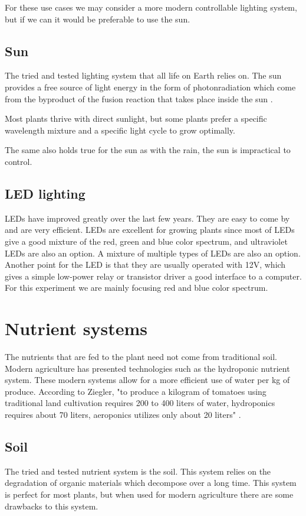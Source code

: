 \documentclass[a4paper,12pt,twoside,openright,titlepage]{book}
\begin{document}
For these use cases we may consider a more modern controllable lighting system, but if we can it would be preferable to use the sun.

\subsection{Sun}
The tried and tested lighting system that all life on Earth relies on.
The sun provides a free source of light energy in the form of photonradiation which come from the byproduct of the fusion reaction that takes place inside the sun \cite{abhyankar}.

Most plants thrive with direct sunlight, but some plants prefer a specific wavelength mixture and a specific light cycle to grow optimally.

The same also holds true for the sun as with the rain, the sun is impractical to control.

\subsection{LED lighting}
LEDs have improved greatly over the last few years. They are easy to come by and are very efficient.
LEDs are excellent for growing plants since most of LEDs give a good mixture of the red, green and blue color spectrum, and ultraviolet LEDs are also an option.
A mixture of multiple types of LEDs are also an option.
Another point for the LED is that they are usually operated with 12V, which gives a simple low-power relay or transistor driver a good interface to a computer.
For this experiment we are mainly focusing red and blue color spectrum.

\section{Nutrient systems}
The nutrients that are fed to the plant need not come from traditional soil.
Modern agriculture has presented technologies such as the hydroponic nutrient system.
These modern systems allow for a more efficient use of water per kg of produce.
According to Ziegler, "to produce a kilogram of tomatoes using traditional land
cultivation requires 200 to 400 liters of water, hydroponics requires about 70 liters,
aeroponics utilizes only about 20 liters" \cite{aeroponic}.

\subsection{Soil}
The tried and tested nutrient system is the soil. This system relies on the degradation of organic materials which decompose over a long time. This system is perfect for most plants, but when used for modern agriculture there are some drawbacks to this system.
\end{document}
